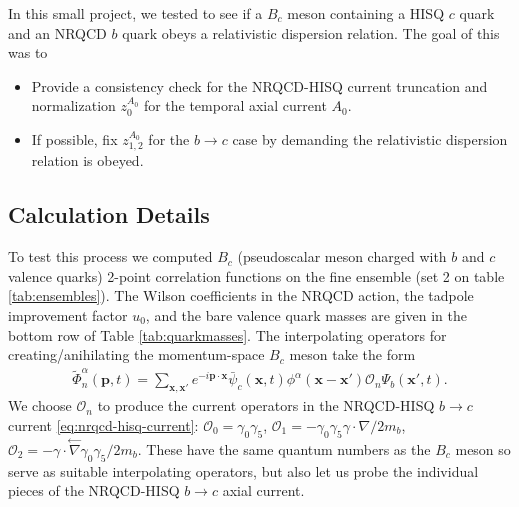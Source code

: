 In this small project, we tested to see if a $B_c$ meson containing a HISQ $c$ quark and an NRQCD $b$ quark obeys a relativistic dispersion relation. The goal of this was to
\begin{itemize}
\item
  Provide a consistency check for the NRQCD-HISQ current truncation and normalization $z_0^{A_0}$ for the temporal axial current $A_0$.
\item
  If possible, fix $z^{A_0}_{1,2}$ for the $b\to c$ case by demanding the relativistic dispersion relation is obeyed.
\end{itemize}

\subsection{Calculation Details}

To test this process we computed $B_c$ (pseudoscalar meson charged with $b$ and $c$ valence quarks) 2-point correlation functions on the fine ensemble (set 2 on table \ref{tab:ensembles}). The Wilson coefficients in the NRQCD action, the tadpole improvement factor $u_0$, and the bare valence quark masses are given in the bottom row of Table \ref{tab:quarkmasses}. The interpolating operators for creating/anihilating the momentum-space $B_c$ meson take the form
\begin{align}
  \tilde{\Phi}_n^{\alpha}(\textbf{p},t) = \sum_{\textbf{x},\textbf{x}'} e^{-i\textbf{p}\cdot\textbf{x}} \bar{\psi}_c(\textbf{x},t) \phi^{\alpha}(\textbf{x}-\textbf{x}')\mathcal{O}_n \Psi_b(\textbf{x}',t).
\end{align}
We choose $\mathcal{O}_n$ to produce the current operators in the NRQCD-HISQ $b\to c$ current \eqref{eq:nrqcd-hisq-current}: $\mathcal{O}_0 = \gamma_0\gamma_5$, $\mathcal{O}_1 = -\gamma_0\gamma_5 \gamma\cdot \nabla /2m_b$, $\mathcal{O}_2 = - \gamma\cdot \stackrel{\leftarrow}{\nabla} \gamma_0\gamma_5  /2m_b$. These have the same quantum numbers as the $B_c$ meson so serve as suitable interpolating operators, but also let us probe the individual pieces of the NRQCD-HISQ $b\to c$ axial current.

